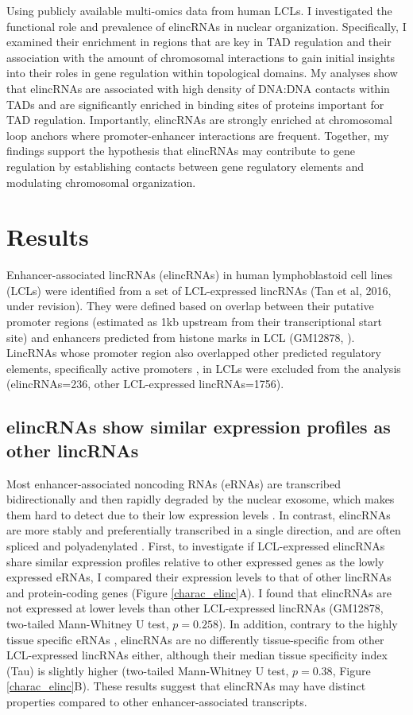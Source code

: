 \documentclass[11pt,a4paper]{report}
\begin{document}
Using publicly available multi-omics data from human LCLs. I investigated the functional role and prevalence of elincRNAs in nuclear organization. Specifically, I examined their enrichment in regions that are key in TAD regulation and their association with the amount of chromosomal interactions to gain initial insights into their roles in gene regulation within topological domains. My analyses show that elincRNAs are associated with high density of DNA:DNA contacts within TADs and are significantly enriched in binding sites of proteins important for TAD regulation. Importantly, elincRNAs are strongly enriched at chromosomal loop anchors where promoter-enhancer interactions are frequent. Together, my findings support the hypothesis that elincRNAs may contribute to gene regulation by establishing contacts between gene regulatory elements and modulating chromosomal organization.

\section*{Results}

Enhancer-associated lincRNAs (elincRNAs) in human lymphoblastoid cell lines (LCLs) were identified from a set of LCL-expressed lincRNAs (Tan et al, 2016, under revision). They were defined based on overlap between their putative promoter regions (estimated as 1kb upstream from their transcriptional start site) and enhancers predicted from histone marks in LCL (GM12878, \cite{ENCODEProject2012}⁠). LincRNAs whose promoter region also overlapped other predicted regulatory elements, specifically active promoters \cite{ENCODEProject2012}⁠, in LCLs were excluded from the analysis (elincRNAs=236, other LCL-expressed lincRNAs=1756).

\subsection*{elincRNAs show similar expression profiles as other lincRNAs}

Most enhancer-associated noncoding RNAs (eRNAs) are transcribed bidirectionally and then rapidly degraded by the nuclear exosome, which makes them hard to detect due to their low expression levels \cite{Darrow2013} \cite{Lam2014}⁠. In contrast, elincRNAs are more stably and preferentially transcribed in a single direction, and are often spliced and polyadenylated \cite{Marques2013a}⁠. 
First, to investigate if LCL-expressed elincRNAs share similar expression profiles relative to other expressed genes as the lowly expressed eRNAs, I compared  their expression levels to that of other lincRNAs and protein-coding genes (Figure \ref{charac_elinc}A). I found that elincRNAs are not expressed at lower levels than other LCL-expressed lincRNAs (GM12878, two-tailed Mann-Whitney U test, $p=0.258$). In addition, contrary to the highly tissue specific eRNAs \cite{Wu2014}, elincRNAs are no differently tissue-specific from other LCL-expressed lincRNAs either, although their median tissue specificity index (Tau) is slightly higher (two-tailed Mann-Whitney U test, $p=0.38$, Figure \ref{charac_elinc}B). These results suggest that elincRNAs may have distinct properties compared to other enhancer-associated transcripts.
\end{document}
